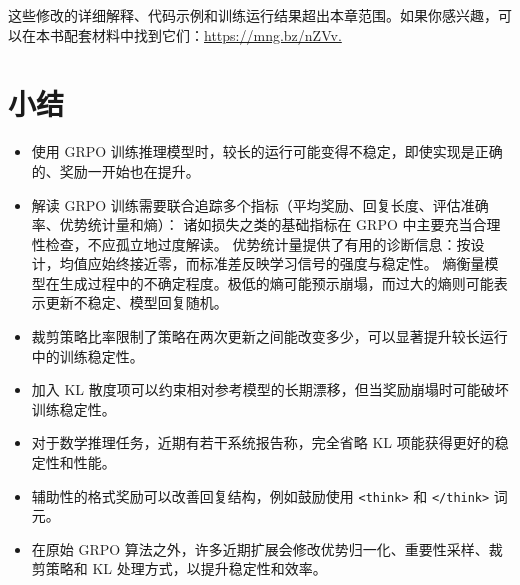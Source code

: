 这些修改的详细解释、代码示例和训练运行结果超出本章范围。如果你感兴趣，可以在本书配套材料中找到它们：\href{https://mng.bz/nZVv.}{https://mng.bz/nZVv.}

\section{小结}

\begin{itemize}
\item 使用 GRPO 训练推理模型时，较长的运行可能变得不稳定，即使实现是正确的、奖励一开始也在提升。
\item 解读 GRPO 训练需要联合追踪多个指标（平均奖励、回复长度、评估准确率、优势统计量和熵）： 诸如损失之类的基础指标在 GRPO 中主要充当合理性检查，不应孤立地过度解读。 优势统计量提供了有用的诊断信息：按设计，均值应始终接近零，而标准差反映学习信号的强度与稳定性。 熵衡量模型在生成过程中的不确定程度。极低的熵可能预示崩塌，而过大的熵则可能表示更新不稳定、模型回复随机。
\item 裁剪策略比率限制了策略在两次更新之间能改变多少，可以显著提升较长运行中的训练稳定性。
\item 加入 KL 散度项可以约束相对参考模型的长期漂移，但当奖励崩塌时可能破坏训练稳定性。
\item 对于数学推理任务，近期有若干系统报告称，完全省略 KL 项能获得更好的稳定性和性能。
\item 辅助性的格式奖励可以改善回复结构，例如鼓励使用 \texttt{\textless{}think\textgreater{}} 和 \texttt{\textless{}/think\textgreater{}} 词元。
\item 在原始 GRPO 算法之外，许多近期扩展会修改优势归一化、重要性采样、裁剪策略和 KL 处理方式，以提升稳定性和效率。
\end{itemize}
